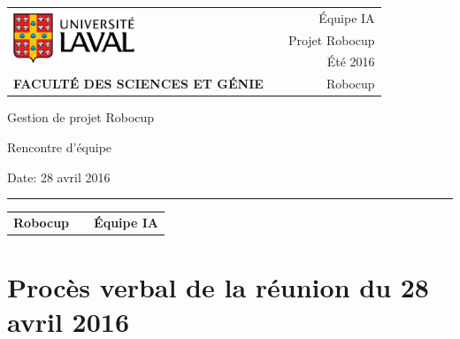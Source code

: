 \documentclass[12pt,letterpaper,twoside]{article}
\begin{document}
\setcounter{secnumdepth}{0}
\begin{titlepage}

        \vspace*{1cm}
        \begin{small}
        \begin{tabularx}{\textwidth}{ l X r }
        \multirow{3}{*}{\includegraphics[height=1.5cm,keepaspectratio]{ul_logo.pdf}}
        && \'Equipe IA\\
        && Projet Robocup\\
        && Été 2016\\

        \scriptsize{\textbf{FACULTÉ DES SCIENCES ET GÉNIE}} && Robocup
        \end{tabularx}
        \end{small}

        \vfill

        \begin{center}

        Gestion de projet Robocup

        \vspace{0.5cm}

        Rencontre d'\'equipe

        \vspace{2cm}

        \end{center}

        \vfill

        Date: 28 avril 2016

        \vspace{0.4cm}

        \rule{\textwidth}{2pt}

        \vspace{0.3cm}

        \begin{tabularx}{\textwidth}{ l X r }

        \textbf{Robocup} && \textbf{\'Equipe IA} \\

        \end{tabularx}


\end{titlepage}


\section*{Proc\`es verbal de la réunion du 28 avril 2016}
\end{document}
